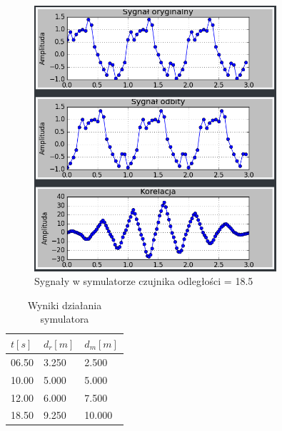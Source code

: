 \documentclass{article}
\begin{document}
{{            \begin{figure}[h!]
                \centering
                \includegraphics[width=0.8\textwidth]{img/sim4.png}
                \caption{Sygnały w symulatorze czujnika odległości = 18.5}
            \end{figure}
            \FloatBarrier
            \begin{table}[h!]
                \centering
                \begin{tabular}{|l|l|l|}
                    \hline
                    $t[s]$ & $d_r[m]$ & $d_m[m]$ \\ \hline
                    06.50  & 3.250    & 2.500    \\ \hline
                    10.00  & 5.000    & 5.000    \\ \hline
                    12.00  & 6.000    & 7.500    \\ \hline
                    18.50  & 9.250    & 10.000    \\ \hline
                \end{tabular}
                \caption{Wyniki działania symulatora}
            \end{table}
        }
        \newpage

}
\end{document}

